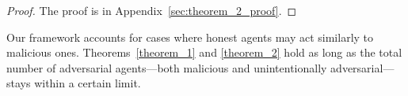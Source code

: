 \begin{proof}
The proof is in Appendix~\ref{sec:theorem_2_proof}.
\end{proof}


\begin{remark}
Our framework accounts for cases where honest agents may act similarly to malicious ones. Theorems~\ref{theorem_1} and \ref{theorem_2} hold as long as the total number of adversarial agents—both malicious and unintentionally adversarial—stays within a certain limit.
\end{remark}


